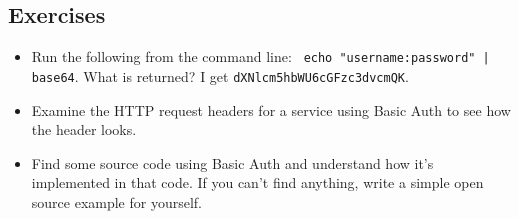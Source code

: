 \subsection{Exercises}

\begin{itemize}
  \item Run the following from the command line: \texttt{%
      echo "username:password" | base64}. What is returned?
    I get \texttt{dXNlcm5hbWU6cGFzc3dvcmQK}.
  \item Examine the HTTP request headers for a service using Basic Auth
    to see how the header looks.
  \item Find some source code using Basic Auth and understand how
    it's implemented in that code. If you can't find anything, write
    a simple open source example for yourself.
\end{itemize}


